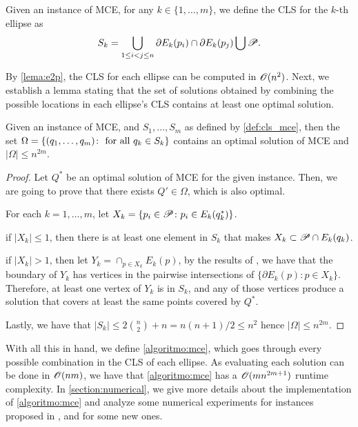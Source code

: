 \begin{definition}\label{def:cls_mce}
	Given an instance of MCE, for any $k \in \{1, \dots, m\}$, we define the CLS for the $k$-th ellipse as
	\begin{equation}
	S_k = \bigcup_{1 \le i < j \le n} \partial E_k(p_i) \cap \partial E_k(p_j) \bigcup \mathscr{P}.
	\end{equation}
\end{definition}

By \autoref{lema:e2p}, the CLS for each ellipse can be computed in $\mathscr{O}(n^2)$. Next, we establish a lemma stating that the set of solutions obtained by combining the possible locations in each ellipse's CLS contains at least one optimal solution.

\begin{thm}
	Given an instance of MCE, and $S_1, \dots, S_m$ as defined by \autoref{def:cls_mce}, then the set $\Omega = \{(q_1, \dots, q_m) \colon \textnormal{ for all }q_k \in S_k \}$ contains an optimal solution of MCE and $|\Omega| \le n^{2m}$. 
\end{thm}
\begin{proof}
	Let $Q^*$ be an optimal solution of MCE for the given instance. Then, we are going to prove that there exists $Q' \in \Omega$, which is also optimal.
	
	For each $k=1, \dots, m$, let $X_k = \{p_i \in \mathscr{P}\colon p_i \in E_k(q_k^*)\}$.
	
	
	if $|X_k| \le 1$, then there is at least one element in $S_k$ that makes $X_k \subset \mathscr{P} \cap E_k(q_k)$.
	
	if $|X_k| > 1$, then let $Y_k = \cap_{p \in X_k}E_k(p)$, by the results of \cite{bi}, we have that the boundary of $Y_k$ has vertices in the pairwise intersections of $\{\partial E_k(p) \colon p \in X_k\}$. Therefore, at least one vertex of $Y_k$ is in $S_k$, and any of those vertices produce a solution that covers at least the same points covered by $Q^*$.
	
	Lastly, we have that $|S_k| \le 2\binom{n}{2} + n = n(n+1)/2 \le n^2$ hence $|\Omega| \le n^{2m}$.
\end{proof}

With all this in hand, we define \autoref{algoritmo:mce}, which goes through every possible combination in the CLS of each ellipse. As evaluating each solution can be done in $\mathscr{O}(nm)$, we have that \autoref{algoritmo:mce} has a $\mathscr{O}(mn^{2m+1})$ runtime complexity. 
In \autoref{section:numerical}, we give more details about the implementation of \autoref{algoritmo:mce} and analyze some numerical experiments for instances proposed in \cite{canbolat, andreta}, and for some new ones.

